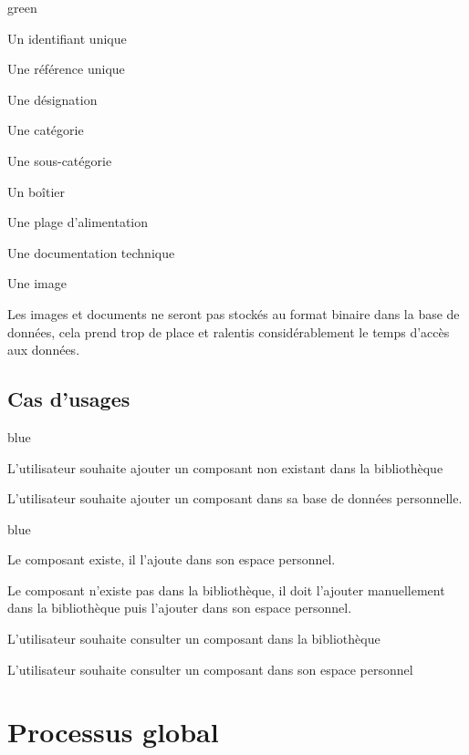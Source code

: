 {\begin{items}{green}{\Bullet}
    \item Un identifiant unique \\
    \item Une référence unique \\
     
    \item Une désignation 
    \item Une catégorie
    \item Une sous-catégorie
    \item Un boîtier
    \item Une plage d'alimentation
    \item Une documentation technique
    \item Une image
\end{items}

Les images et documents ne seront pas stockés au format binaire dans la base de données, cela prend trop de place et ralentis considérablement le temps d'accès aux données.



\section{Cas d'usages}
\begin{items}{blue}{\Triangle}

    \item L'utilisateur souhaite ajouter un composant non existant dans la bibliothèque
    \item L'utilisateur souhaite ajouter un composant dans sa base de données personnelle.
    \begin{items}{blue}{\Bullet}
        \item Le composant existe, il l'ajoute dans son espace personnel.
        \item Le composant n'existe pas dans la bibliothèque, il doit l'ajouter manuellement dans la bibliothèque puis l'ajouter dans son espace personnel.
    \end{items}
    \item L'utilisateur souhaite consulter un composant dans la bibliothèque
    \item L'utilisateur souhaite consulter un composant dans son espace personnel
\end{items}

\chapter{Processus global}


}
